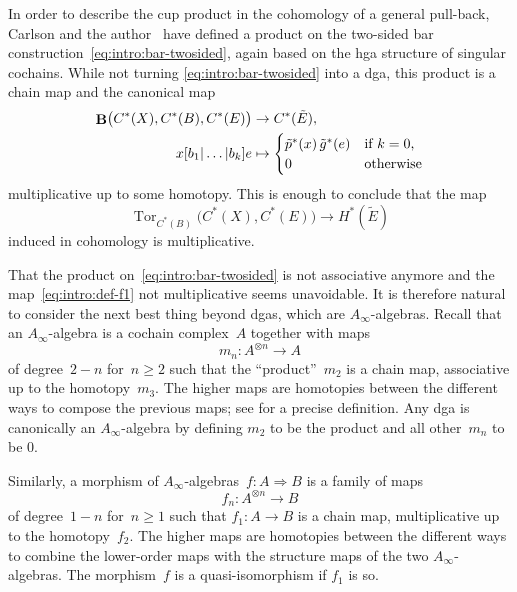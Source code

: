 \documentclass[letterpaper]{amsart}
\numberwithin{equation}{section}
\theoremstyle{plain}
\theoremstyle{definition}
\theoremstyle{remark}
\DeclareMathOperator{\Tor}{Tor}
\def\Ainf{A_{\infty}}
\DeclareMathOperator{\BB}{\mathbf{B}}
\def\gE{\tilde{E}}
\def\gp{\tilde{p}}
\begin{document}
In order to describe the cup product in the cohomology of a general pull-back, Carlson and the author~\cite{CarlsonFranz}
have defined a product on the two-sided bar construction~\eqref{eq:intro:bar-twosided},
again based on the hga structure of singular cochains. While not turning \eqref{eq:intro:bar-twosided}
into a dga, this product is a chain map and the canonical map
\begin{align}
  \label{eq:intro:def-f1}
  \BB\bigl(C^{*}(X),C^{*}(B),C^{*}(E)\bigr) & \to C^{*}(\gE), \\
  \notag %
  x[b_{1}|\dots|b_{k}]e &\mapsto \begin{cases}
    \gp^{*}(x)\,\tilde{g}^{*}(e) & \text{if $k=0$,} \\
    0 & \text{otherwise}
  \end{cases}  
\end{align}
multiplicative up to some homotopy.
This is enough to conclude that the map
\begin{equation}
  \Tor_{C^{*}(B)}\bigl(C^{*}(X),C^{*}(E)\bigr) \to H^{*}(\gE)
\end{equation}
induced in cohomology is multiplicative.

That the product on~\eqref{eq:intro:bar-twosided} is not associative anymore
and the map~\eqref{eq:intro:def-f1} not multiplicative seems unavoidable.
It is therefore natural to consider the next best thing beyond dgas, which are $\Ainf$-algebras.
Recall that an $\Ainf$-algebra is a cochain complex~$A$ together with maps
\begin{equation}
  m_{n}\colon A^{\otimes n}\to A
\end{equation}
of degree~$2-n$ for~$n\ge2$ such that the ``product''~$m_{2}$ is a chain map, associative up to the homotopy~$m_{3}$.
The higher maps are homotopies between the different ways to compose the previous maps; see  for a precise definition.
Any dga is canonically an $\Ainf$-algebra by defining $m_{2}$ to be the product and all other~$m_{n}$ to be $0$.

Similarly, a morphism of $\Ainf$-algebras~$f\colon A\Rightarrow B$ is a family of maps
\begin{equation}
  f_{n}\colon A^{\otimes n}\to B
\end{equation}
of degree~$1-n$ for~$n\ge1$ such that $f_{1}\colon A\to B$ is a chain map, multiplicative
up to the homotopy~$f_{2}$. The higher maps are homotopies between the different ways
to combine the lower-order maps with the structure maps of the two $\Ainf$-algebras.
The morphism~$f$ is a quasi-isomorphism if $f_{1}$ is so.
\end{document}
